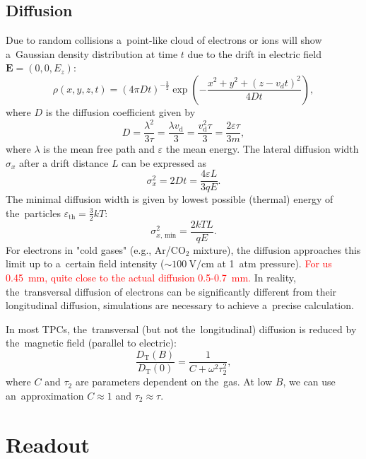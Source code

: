 		\subsection{Diffusion}
			Due to random collisions a~point-like cloud of electrons or ions will show a~Gaussian density distribution at time $t$ due to the drift in electric field $\mathbf{E} = (0,0,E_z)$:
				\begin{equation}
					\rho(x,y,z,t) = (4\pi Dt)^{-\frac{3}{2}} \exp\left(-\frac{x^2+y^2+(z-v_dt)^2}{4Dt}\right),
				\end{equation}
			where $D$ is the diffusion coefficient given by
				\begin{equation}
					D = \frac{\lambda^2}{3\tau} = \frac{\lambda v_\text{d}}{3} = \frac{v_\text{d}^2\tau}{3} = \frac{2\varepsilon\tau}{3m},
				\end{equation}
			where $\lambda$ is the mean free path and $\varepsilon$ the mean energy. The lateral diffusion width $\sigma_x$ after a drift distance $L$ can be expressed as
				\begin{equation}
					\sigma_x^2 = 2Dt = \frac{4\varepsilon L}{3qE}.
				\end{equation}
			The minimal diffusion width is given by lowest possible (thermal) energy of the~particles $\varepsilon_\text{th} = \frac{3}{2}kT$:
				\begin{equation}
					\sigma_{x, \,\text{min}}^2 = \frac{2kTL}{qE}.
				\end{equation}
			For electrons in "cold gases" (e.g., Ar/CO$_2$ mixture), the diffusion approaches this limit up to a~certain field intensity ($\sim 100~\text{V}/\text{cm}$ at 1~atm pressure). \textcolor{red}{For us 0.45~mm, quite close to the actual diffusion 0.5-0.7~mm.} In reality, the~transversal diffusion of electrons can be significantly different from their longitudinal diffusion, simulations are necessary to achieve a~precise calculation.
			
			In most \ac{TPC}s, the~transversal (but not the~longitudinal) diffusion is reduced by the~magnetic field (parallel to electric):
				\begin{equation}
					\label{eq:difmag}
					\frac{D_\text{T}(B)}{D_\text{T}(0)} = \frac{1}{C+\omega^2\tau_2^2},
				\end{equation}
			where $C$ and $\tau_2$ are parameters dependent on the~gas. At low $B$, we can use an~approximation $C\approx1$ and $\tau_2\approx\tau$.
	
	\section{Readout}
